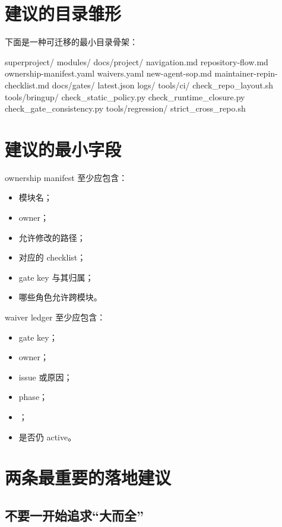 \documentclass[UTF8,11pt,a4paper,oneside]{ctexbook}
\begin{document}
\section{建议的目录雏形}

下面是一种可迁移的最小目录骨架：

\begin{CodeBlock}
superproject/
  modules/
  docs/project/
    navigation.md
    repository-flow.md
    ownership-manifest.yaml
    waivers.yaml
    new-agent-sop.md
    maintainer-repin-checklist.md
  docs/gates/
    latest.json
    logs/
  tools/ci/
    check_repo_layout.sh
  tools/bringup/
    check_static_policy.py
    check_runtime_closure.py
    check_gate_consistency.py
  tools/regression/
    strict_cross_repo.sh
\end{CodeBlock}

\section{建议的最小字段}

ownership manifest 至少应包含：

\begin{itemize}
  \item 模块名；
  \item owner；
  \item 允许修改的路径；
  \item 对应的 checklist；
  \item gate key 与其归属；
  \item 哪些角色允许跨模块。
\end{itemize}

waiver ledger 至少应包含：

\begin{itemize}
  \item gate key；
  \item owner；
  \item issue 或原因；
  \item phase；
  \item {}；
  \item 是否仍 active。
\end{itemize}

\section{两条最重要的落地建议}

\subsection{不要一开始追求“大而全”}
\end{document}
